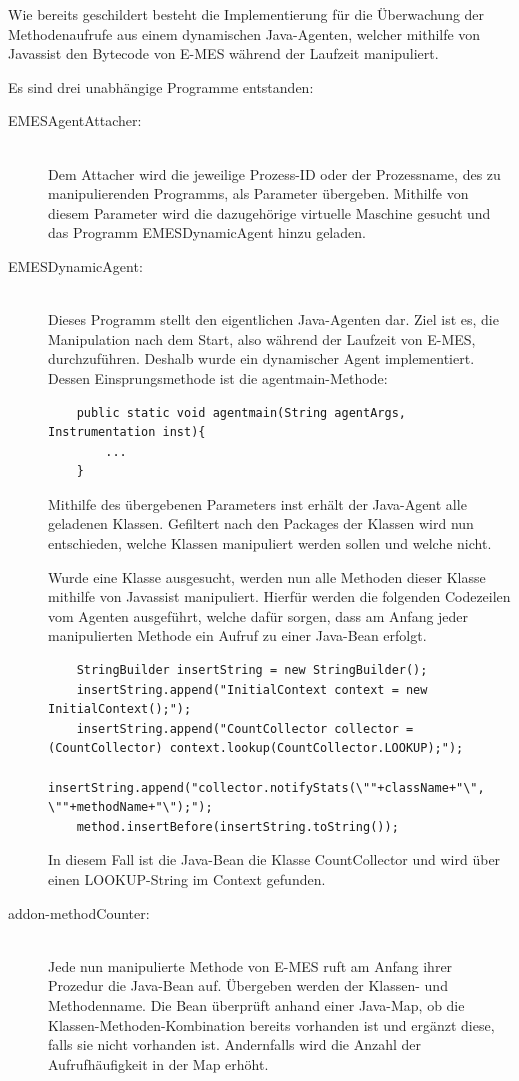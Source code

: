 Wie bereits geschildert besteht die Implementierung für die Überwachung der Methodenaufrufe aus einem dynamischen Java-Agenten, welcher mithilfe von Javassist den Bytecode von E-MES während der Laufzeit manipuliert.

Es sind drei unabhängige Programme entstanden:
\begin{description}
    \item[EMESAgentAttacher:]\hfill \\
    Dem \glqq Attacher\grqq{} wird die jeweilige Prozess-ID oder der Prozessname, des zu manipulierenden Programms, als Parameter übergeben. Mithilfe von diesem Parameter wird die dazugehörige virtuelle Maschine gesucht und das Programm \glqq EMESDynamicAgent\grqq{} hinzu geladen.
    \item[EMESDynamicAgent:]\hfill \\
    Dieses Programm stellt den eigentlichen Java-Agenten dar. Ziel ist es, die Manipulation nach dem Start, also während der Laufzeit von E-MES, durchzuführen. Deshalb wurde ein dynamischer Agent implementiert. Dessen Einsprungsmethode ist die agentmain-Methode:
    \begin{lstlisting}
    public static void agentmain(String agentArgs, Instrumentation inst){
        ...
    }
    \end{lstlisting}
    Mithilfe des übergebenen Parameters \glqq inst\grqq{} erhält der Java-Agent alle geladenen Klassen. Gefiltert nach den Packages der Klassen wird nun entschieden, welche Klassen manipuliert werden sollen und welche nicht.

    Wurde eine Klasse ausgesucht, werden nun alle Methoden dieser Klasse mithilfe von Javassist manipuliert. Hierfür werden die folgenden Codezeilen vom Agenten ausgeführt, welche dafür sorgen, dass am Anfang jeder manipulierten Methode ein Aufruf zu einer Java-Bean erfolgt.
    \begin{lstlisting}
    StringBuilder insertString = new StringBuilder();
    insertString.append("InitialContext context = new InitialContext();");
    insertString.append("CountCollector collector = (CountCollector) context.lookup(CountCollector.LOOKUP);");
    insertString.append("collector.notifyStats(\""+className+"\", \""+methodName+"\");");
    method.insertBefore(insertString.toString());
    \end{lstlisting}
    In diesem Fall ist die Java-Bean die Klasse \glqq CountCollector\grqq{} und wird über einen LOOKUP-String im Context gefunden.
    \item[addon-methodCounter:]\hfill \\
    Jede nun manipulierte Methode von E-MES ruft am Anfang ihrer Prozedur die Java-Bean auf. Übergeben werden der Klassen- und Methodenname. Die Bean überprüft anhand einer Java-Map, ob die Klassen-Methoden-Kombination bereits vorhanden ist und ergänzt diese, falls sie nicht vorhanden ist. Andernfalls wird die Anzahl der Aufrufhäufigkeit in der Map erhöht.
\end{description}

